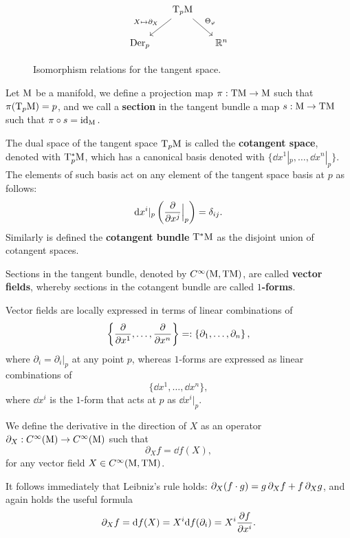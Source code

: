 \begin{figure}
	\centering
	\[
	\begin{tikzcd}[column sep=1.5em]
	& \mT_p\mM \arrow{dr}{\Theta_\varphi} \\
	\operatorname{Der}_p \arrow[<-]{ur}{X\mapsto \partial_X} && \mR^n
	\end{tikzcd}
	\]
	\caption{Isomorphism relations for the tangent space.}
\end{figure}






\begin{definition}
	Let $\mathrm{M}$ be a manifold, we define a projection map $\pi:\mathrm{T}\mathrm{M}\to\mathrm{M}$ such that $\pi(\mathrm{T}_p\mathrm{M})=p$, and we call a \textbf{section} in the tangent bundle a map $s:\mathrm{M}\to\mathrm{T}\mathrm{M}$ such that
	$\pi\circ s=\operatorname{id}_{\mathrm{M}}.$
\end{definition}
	\noindent The dual space of the tangent space $\mathrm{T}_p\mathrm{M}$ is called the \textbf{cotangent space}, denoted with $\mathrm{T}^*_p\mathrm{M}$, which has a canonical basis denoted with $\{\dd x^1|_p,\dots,\dd x^n|_p\}$.\\
	The elements of such basis act on any element of the tangent space basis at $p$ as follows:
	\[	\mathrm d x^i|_p\left(\frac{\partial }{\partial x^j}\Big|_p\right)=\delta_{ij}.		\]
	Similarly is defined the \textbf{cotangent bundle} $\mathrm{T}^*\mathrm{M}$ as the disjoint union of cotangent spaces.
	\begin{definition}
	Sections in the tangent bundle, denoted by $C^\infty(\mathrm{M},\mathrm{T}\mathrm{M})$, are called \textbf{vector fields}, whereby sections in the cotangent bundle are called \textbf{$1$-forms}.
	\end{definition}

	Vector fields are locally expressed in terms of linear combinations of \[\left\{  \frac{\partial  }{\partial x^1},\dots,\frac{\partial  }{\partial x^n}    \right\}=:\left\{\partial_1,\dots,\partial_n\right\},\] where $\partial_i=\partial_i|_p$ at any point $p$, whereas $1$-forms are expressed as linear combinations of $$\{\dd x^1,\dots,\dd x^n\},$$
	where $\dd x^i$ is the $1$-form that acts at $p$ as $\dd x^i|_p$.




\begin{definition}
We define the derivative in the direction of $X$ as an operator $\partial_X:C^\infty(\mathrm{M})\to C^\infty(\mathrm{M})$ such that
	\[ \partial_X f=\dd f(X), \]
for any vector field $X\in C^\infty(\mathrm{M},\mathrm{T}\mathrm{M})$.
\end{definition}
\noindent It follows immediately that Leibniz's rule holds: $\displaystyle \partial_X (f\cdot g)=g\,\partial_Xf +f\,\partial_X g$, and again holds the useful formula
\[	\partial_X f=\mathrm d f(X)=X^i\mathrm d f(\partial_i)=X^i\frac{\partial f}{\partial x^i}.	\]

